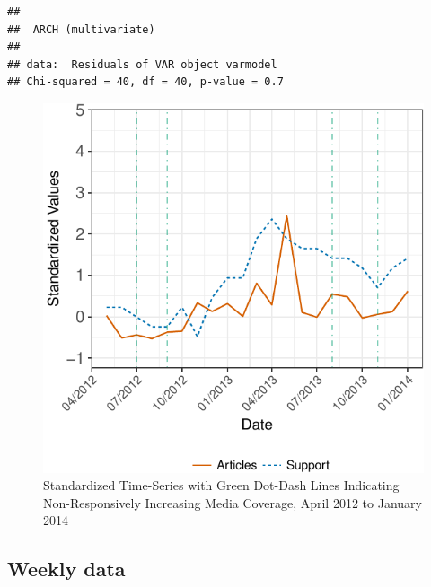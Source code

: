 \documentclass[12pt,]{article}
\makeatletter
\def\maxwidth{\ifdim\Gin@nat@width>\linewidth\linewidth
\else\Gin@nat@width\fi}
\let\Oldincludegraphics\includegraphics
\renewcommand{\includegraphics}[1]{\Oldincludegraphics[width=\maxwidth]{#1}}
\makeatother
\begin{document}
\begin{verbatim}
## 
##  ARCH (multivariate)
## 
## data:  Residuals of VAR object varmodel
## Chi-squared = 40, df = 40, p-value = 0.7
\end{verbatim}

\newpage

\begin{figure}[htbp]
\centering
\includegraphics{ukip_media_files/figure-latex/qual-zoomed-plot-1.pdf}
\caption{Standardized Time-Series with Green Dot-Dash Lines Indicating
Non-Responsively Increasing Media Coverage, April 2012 to January 2014}
\end{figure}

\subsection{Weekly data}\label{weekly-data}

\newpage


\end{document}
